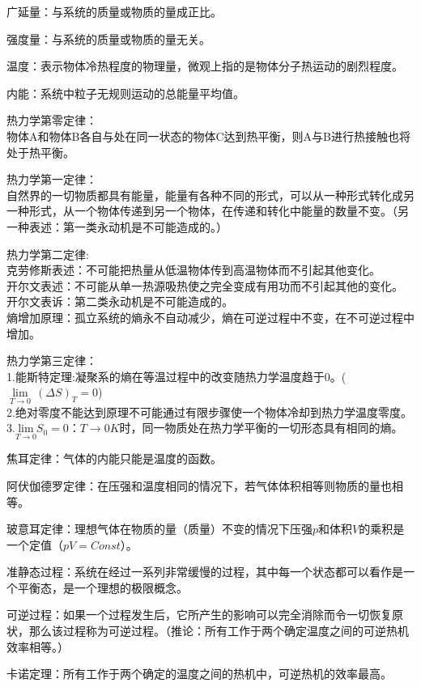 \documentclass[12pt]{article}
\begin{document}
\noindent
广延量：与系统的质量或物质的量成正比。

\noindent
强度量：与系统的质量或物质的量无关。

\noindent
温度：表示物体冷热程度的物理量，微观上指的是物体分子热运动的剧烈程度。

\noindent
内能：系统中粒子无规则运动的总能量平均值。

\noindent
热力学第零定律：\\物体A和物体B各自与处在同一状态的物体C达到热平衡，则A与B进行热接触也将处于热平衡。

\noindent
热力学第一定律：\\自然界的一切物质都具有能量，能量有各种不同的形式，可以从一种形式转化成另一种形式，从一个物体传递到另一个物体，在传递和转化中能量的数量不变。（另一种表述：第一类永动机是不可能造成的。）

\noindent
热力学第二定律:\\
克劳修斯表述：不可能把热量从低温物体传到高温物体而不引起其他变化。\\
开尔文表述：不可能从单一热源吸热使之完全变成有用功而不引起其他的变化。\\
开尔文表诉：第二类永动机是不可能造成的。\\
熵增加原理：孤立系统的熵永不自动减少，熵在可逆过程中不变，在不可逆过程中增加。

\noindent
热力学第三定律：\\
1.能斯特定理:凝聚系的熵在等温过程中的改变随热力学温度趋于0。($ \underset{T\to 0}{\mathop{\lim }}\,{{(\Delta S)}_{T}}=0$)\\
2.绝对零度不能达到原理不可能通过有限步骤使一个物体冷却到热力学温度零度。\\
3.$\underset{T\to 0}{\mathrm{lim}}S_0=0$：$T\to 0K$时，同一物质处在热力学平衡的一切形态具有相同的熵。

\noindent
焦耳定律：气体的内能只能是温度的函数。

\noindent
阿伏伽德罗定律：在压强和温度相同的情况下，若气体体积相等则物质的量也相等。

\noindent
玻意耳定律：理想气体在物质的量（质量）不变的情况下压强$p$和体积$V$的乘积是一个定值（$pV=Const$）。

\noindent
准静态过程：系统在经过一系列非常缓慢的过程，其中每一个状态都可以看作是一个平衡态，是一个理想的极限概念。  

\noindent
可逆过程：如果一个过程发生后，它所产生的影响可以完全消除而令一切恢复原状，那么该过程称为可逆过程。（推论：所有工作于两个确定温度之间的可逆热机效率相等。）

\noindent
卡诺定理：所有工作于两个确定的温度之间的热机中，可逆热机的效率最高。
\end{document}
